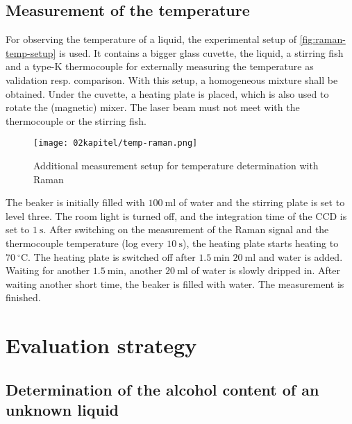 \subsection{Measurement of the temperature}

For observing the temperature of a liquid, the experimental setup of \autoref{fig:raman-temp-setup} is used. It contains a bigger glass cuvette, the liquid, a stirring fish and a type-K thermocouple for externally measuring the temperature as validation resp. comparison. With this setup, a homogeneous mixture shall be obtained. Under the cuvette, a heating plate is placed, which is also used to rotate the (magnetic) mixer. The laser beam must not meet with the thermocouple or the stirring fish.

\begin{figure}[!htb]
    \centering
    \texttt{[image: 02kapitel/temp-raman.png]}
    \caption[Additional measurement setup for temperature determination with Raman]{Additional measurement setup for temperature determination with Raman \autocite{brauerApplicationRamanSpectroscopy2022}}
    \label{fig:raman-temp-setup}
\end{figure}

The beaker is initially filled with $100~\mathrm{ml}$ of water and the stirring plate is set to level three. The room light is turned off, and the integration time of the CCD is set to $1~\mathrm{s}$. After switching on the measurement of the Raman signal and the thermocouple temperature (log every $10~\mathrm{s}$), the heating plate starts heating to $70~\mathrm{^\circ C}$. The heating plate is switched off after $1.5~\mathrm{min}$ $20~\mathrm{ml}$ and water is added. Waiting for another $1.5~\mathrm{min}$, another $20~\mathrm{ml}$ of water is slowly dripped in. After waiting another short time, the beaker is filled with water. The measurement is finished.

\section{Evaluation strategy}

\subsection{Determination of the alcohol content of an unknown liquid}

